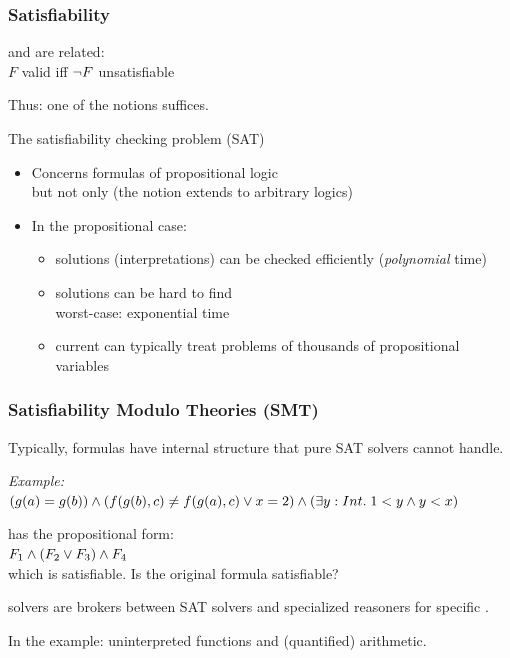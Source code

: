 \documentclass{beamer}
\begin{document}
\begin{frame}[fragile]\frametitle{Satisfiability}

   and  are related:\\
  $F$ valid \hspace{5mm} iff \hspace{5mm} $\neg F$ unsatisfiable

  \vspace{5mm}
  Thus: one of the notions suffices.
  \vspace{5mm}
  
  The satisfiability checking problem (SAT)
  \begin{itemize}
  \item Concerns formulas of propositional logic\\
    but not only (the notion extends to arbitrary logics)
  \item In the propositional case:
    \begin{itemize}
    \item solutions (interpretations) can be checked efficiently
      (\emph{polynomial} time)
    \item solutions can be hard to find\\
      worst-case: exponential time
    \item current  can typically treat problems of thousands of
      propositional variables
    \end{itemize}
  \end{itemize}

\end{frame}

\begin{frame}[fragile]\frametitle{Satisfiability Modulo Theories (SMT)}

Typically, formulas have internal structure that pure SAT solvers cannot
handle.

\vspace{5mm}
\emph{Example:}\\
$(g(a) = g(b)) \wedge (f(g(b), c) \neq f(g(a), c) \vee x = 2) \wedge (\exists y:Int.\; 1 < y \wedge y < x)$

has the propositional form:\\
$F_1 \wedge (F_2 \vee F_3) \wedge F_4$\\
which is satisfiable. Is the original formula satisfiable?

\vspace{5mm}
 solvers are brokers between SAT solvers and specialized reasoners
for specific .

\vspace{5mm}
In the example: uninterpreted functions and (quantified) arithmetic.


\end{frame}
\end{document}
